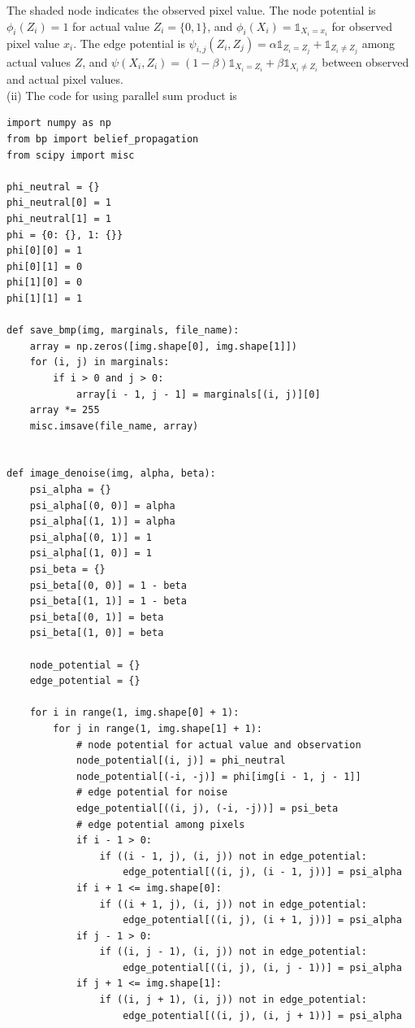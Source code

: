 \documentclass{article}
\begin{document}
The shaded node indicates the observed pixel value. The node potential is $\phi_i(Z_i)=1$ for actual value $Z_i=\{0, 1\}$, and $\phi_i(X_i)=\mathds{1}_{X_i = x_i}$ for observed pixel value $x_i$. The edge potential is $\psi_{i,j}(Z_i, Z_j)=\alpha \mathds{1}_{Z_i=Z_j} + \mathds{1}_{Z_i\neq Z_j}$ among actual values $Z$, and $\psi(X_i, Z_i)=(1-\beta) \mathds{1}_{X_i=Z_i} + \beta\mathds{1}_{X_i\neq Z_i}$ between observed and actual pixel values. 
\\

\noindent
(ii) The code for using parallel sum product is
\lstset{language=Python}
\lstset{frame=lines}
\lstset{basicstyle=\footnotesize}
\begin{lstlisting}
import numpy as np
from bp import belief_propagation
from scipy import misc

phi_neutral = {}
phi_neutral[0] = 1
phi_neutral[1] = 1
phi = {0: {}, 1: {}}
phi[0][0] = 1
phi[0][1] = 0
phi[1][0] = 0
phi[1][1] = 1

def save_bmp(img, marginals, file_name):
    array = np.zeros([img.shape[0], img.shape[1]])
    for (i, j) in marginals:
        if i > 0 and j > 0:
            array[i - 1, j - 1] = marginals[(i, j)][0]
    array *= 255
    misc.imsave(file_name, array)


def image_denoise(img, alpha, beta):
    psi_alpha = {}
    psi_alpha[(0, 0)] = alpha
    psi_alpha[(1, 1)] = alpha
    psi_alpha[(0, 1)] = 1
    psi_alpha[(1, 0)] = 1
    psi_beta = {}
    psi_beta[(0, 0)] = 1 - beta
    psi_beta[(1, 1)] = 1 - beta
    psi_beta[(0, 1)] = beta
    psi_beta[(1, 0)] = beta

    node_potential = {}
    edge_potential = {}

    for i in range(1, img.shape[0] + 1):
        for j in range(1, img.shape[1] + 1):
            # node potential for actual value and observation
            node_potential[(i, j)] = phi_neutral
            node_potential[(-i, -j)] = phi[img[i - 1, j - 1]]
            # edge potential for noise
            edge_potential[((i, j), (-i, -j))] = psi_beta
            # edge potential among pixels
            if i - 1 > 0:
                if ((i - 1, j), (i, j)) not in edge_potential:
                    edge_potential[((i, j), (i - 1, j))] = psi_alpha
            if i + 1 <= img.shape[0]:
                if ((i + 1, j), (i, j)) not in edge_potential:
                    edge_potential[((i, j), (i + 1, j))] = psi_alpha
            if j - 1 > 0:
                if ((i, j - 1), (i, j)) not in edge_potential:
                    edge_potential[((i, j), (i, j - 1))] = psi_alpha
            if j + 1 <= img.shape[1]:
                if ((i, j + 1), (i, j)) not in edge_potential:
                    edge_potential[((i, j), (i, j + 1))] = psi_alpha


\end{lstlisting}
\end{document}
